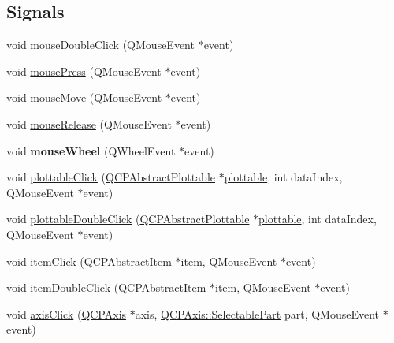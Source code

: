 \subsection*{Signals}
\begin{DoxyCompactItemize}
\item 
void \hyperlink{class_q_custom_plot_a9b232142c64fcf273a953ee08e5b90e9}{mouse\+Double\+Click} (Q\+Mouse\+Event $\ast$event)
\item 
void \hyperlink{class_q_custom_plot_aca75bf9afb5dd19349c375de2a87a051}{mouse\+Press} (Q\+Mouse\+Event $\ast$event)
\item 
void \hyperlink{class_q_custom_plot_a742ca4f94688bed2a685fd8a56ce5704}{mouse\+Move} (Q\+Mouse\+Event $\ast$event)
\item 
void \hyperlink{class_q_custom_plot_ac8dc0ee6bb98e923c00b4ebafbe6134d}{mouse\+Release} (Q\+Mouse\+Event $\ast$event)
\item 
\mbox{\label{class_q_custom_plot_ac80a14206f99304a91d2aa55775ec3ff}} 
void {\bfseries mouse\+Wheel} (Q\+Wheel\+Event $\ast$event)
\item 
void \hyperlink{class_q_custom_plot_af5fe78b8bc9e4e96df921612837fd4fd}{plottable\+Click} (\hyperlink{class_q_c_p_abstract_plottable}{Q\+C\+P\+Abstract\+Plottable} $\ast$\hyperlink{class_q_custom_plot_a32de81ff53e263e785b83b52ecd99d6f}{plottable}, int data\+Index, Q\+Mouse\+Event $\ast$event)
\item 
void \hyperlink{class_q_custom_plot_a86a3ab7263c9c4e008e70d6c5fce9fbd}{plottable\+Double\+Click} (\hyperlink{class_q_c_p_abstract_plottable}{Q\+C\+P\+Abstract\+Plottable} $\ast$\hyperlink{class_q_custom_plot_a32de81ff53e263e785b83b52ecd99d6f}{plottable}, int data\+Index, Q\+Mouse\+Event $\ast$event)
\item 
void \hyperlink{class_q_custom_plot_ae16b51f52d2b7aebbc7e3e74e6ff2e4b}{item\+Click} (\hyperlink{class_q_c_p_abstract_item}{Q\+C\+P\+Abstract\+Item} $\ast$\hyperlink{class_q_custom_plot_ac042f2e78edd228ccf2f26b7fe215239}{item}, Q\+Mouse\+Event $\ast$event)
\item 
void \hyperlink{class_q_custom_plot_ac83aa9f5a3e9bb3efc9cdc763dcd42a6}{item\+Double\+Click} (\hyperlink{class_q_c_p_abstract_item}{Q\+C\+P\+Abstract\+Item} $\ast$\hyperlink{class_q_custom_plot_ac042f2e78edd228ccf2f26b7fe215239}{item}, Q\+Mouse\+Event $\ast$event)
\item 
void \hyperlink{class_q_custom_plot_abf635f8b56ab5c16d5de9f358543e82b}{axis\+Click} (\hyperlink{class_q_c_p_axis}{Q\+C\+P\+Axis} $\ast$axis, \hyperlink{class_q_c_p_axis_abee4c7a54c468b1385dfce2c898b115f}{Q\+C\+P\+Axis\+::\+Selectable\+Part} part, Q\+Mouse\+Event $\ast$event)

\end{DoxyCompactItemize}
